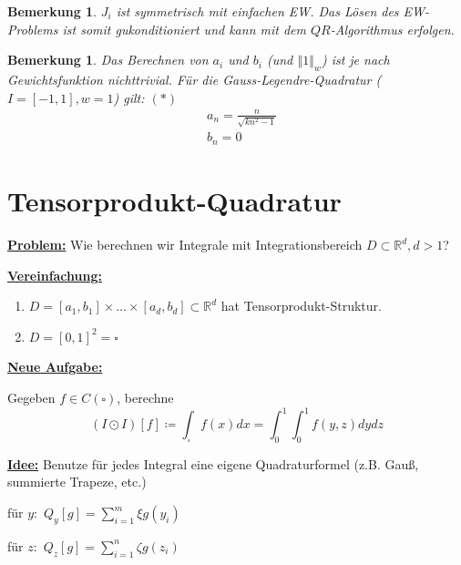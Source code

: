 \documentclass{book}
\newtheorem{remark}[algorithm]{Bemerkung}
\def\R{\mathbb{R}}
\begin{document}
            \begin{remark}\label{b515}
                $J_i$ ist symmetrisch mit einfachen EW. Das Lösen des EW-Problems ist somit gukonditioniert und kann mit dem 
                $QR$-Algorithmus erfolgen.
            \end{remark}

            \begin{remark}\label{516}
                Das Berechnen von $a_i$ und $b_i$ (und $\left\Vert 1 \right\Vert_w$) ist je nach Gewichtsfunktion nichttrivial. Für die Gauss-Legendre-Quadratur ($I=[-1,1],w=1$) gilt: $(*)$
                \begin{align*}
                    &a_n=\frac{n}{\sqrt{kn^2-1}}\\ %
                    &b_n=0
                \end{align*}
            \end{remark}

        \section{Tensorprodukt-Quadratur}

            \underline{\textbf{Problem:}} Wie berechnen wir Integrale mit Integrationsbereich $D\subset \R^d,d>1$?

            \underline{\textbf{Vereinfachung:}} 
            \begin{enumerate}
                \item $D=[a_1,b_1]\times \dots \times [a_d,b_d]\subset \R^d$ hat Tensorprodukt-Struktur.
                \item $D=[0,1]^2=\square$
            \end{enumerate}

            \underline{\textbf{Neue Aufgabe:}}

            Gegeben $f\in C(\square)$, berechne 
            \begin{equation*}
                (I\odot I )[f]\coloneqq \int_\square f(x)dx=\int_0^1\int_0^1 f(y,z)dydz
            \end{equation*}

            \underline{\textbf{Idee:}} Benutze für jedes Integral eine eigene Quadraturformel (z.B. Gauß, summierte Trapeze, etc.)
            
            für $y:$ $Q_y[g]=\sum_{i=1}^m \xi g(y_i)$

            für $z:$ $Q_z[g]=\sum_{i=1}^n \zeta g(z_i)$
\end{document}
